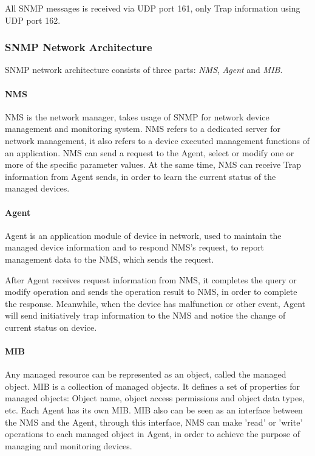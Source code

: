 All SNMP messages is received via UDP port 161, only Trap information using UDP port 162.

\subsubsection{SNMP Network Architecture}

SNMP network architecture consists of three parts: \textit{NMS}, \textit{Agent} and \textit{MIB}.

\paragraph{NMS}

NMS is the network manager, takes usage of SNMP for network device management and monitoring system. NMS refers to a dedicated server for network management, it also refers to a device executed management functions of an application.  
NMS can send a request to the Agent, select or modify one or more of the specific parameter values. At the same time, NMS can receive Trap information from Agent sends, in order to learn the current status of the managed devices.  

\paragraph{Agent}

Agent is an application module of device in network, used to maintain the managed device information and to respond NMS's request, to report management data to the NMS, which sends the request.  

After Agent receives request information from NMS, it completes the query or modify operation and sends the operation result to NMS, in order to complete the response. Meanwhile, when the device has malfunction or other event, Agent will send initiatively trap information to the NMS and notice the change of current status on device.  

\paragraph{MIB}

Any managed resource can be represented as an object, called the managed object. MIB is a collection of managed objects. It defines a set of properties for managed objects: Object name, object access permissions and object data types, etc.  
Each Agent has its own MIB. MIB also can be seen as an interface between the NMS and the Agent, through this interface, NMS can make 'read' or 'write' operations to each managed object in Agent, in order to achieve the purpose of managing and monitoring devices.  

